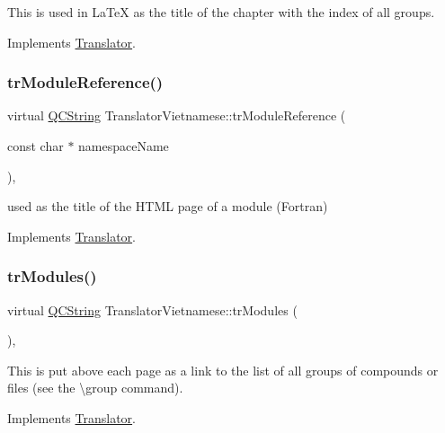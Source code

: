 This is used in La\+TeX as the title of the chapter with the index of all groups. 

Implements \mbox{\hyperlink{class_translator}{Translator}}.

\mbox{\label{class_translator_vietnamese_ab73db393d407c86442a19e5aad6d1b5d}} 
\subsubsection{\texorpdfstring{trModuleReference()}{trModuleReference()}}
{\footnotesize\ttfamily virtual \mbox{\hyperlink{class_q_c_string}{Q\+C\+String}} Translator\+Vietnamese\+::tr\+Module\+Reference (\begin{DoxyParamCaption}\item[{const char $\ast$}]{namespace\+Name }\end{DoxyParamCaption})\hspace{0.3cm}{\ttfamily [inline]}, {\ttfamily [virtual]}}

used as the title of the H\+T\+ML page of a module (Fortran) 

Implements \mbox{\hyperlink{class_translator}{Translator}}.

\mbox{\label{class_translator_vietnamese_a781ee616acb6a6f5979f2652dec7342c}} 
\subsubsection{\texorpdfstring{trModules()}{trModules()}}
{\footnotesize\ttfamily virtual \mbox{\hyperlink{class_q_c_string}{Q\+C\+String}} Translator\+Vietnamese\+::tr\+Modules (\begin{DoxyParamCaption}{ }\end{DoxyParamCaption})\hspace{0.3cm}{\ttfamily [inline]}, {\ttfamily [virtual]}}

This is put above each page as a link to the list of all groups of compounds or files (see the \textbackslash{}group command). 

Implements \mbox{\hyperlink{class_translator}{Translator}}.

